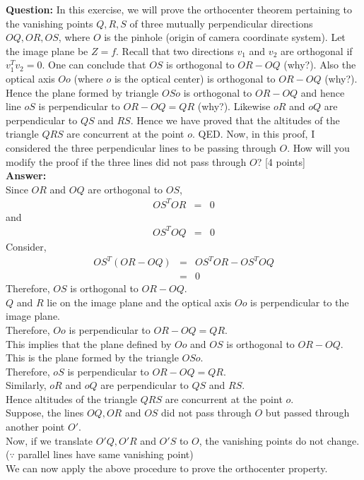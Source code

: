\documentclass[11pt]{article}
\begin{document}
\maketitle

\textbf{Question:} In this exercise, we will prove the orthocenter theorem pertaining to the vanishing points $Q,R,S$ of three mutually perpendicular directions $OQ, OR, OS$, where $O$ is the pinhole (origin of camera coordinate system). Let the image plane be $Z = f$. Recall that two directions $v_1$ and $v_2$ are orthogonal if $v^T_1 v_2 = 0$. One can conclude that $OS$ is orthogonal to $OR-OQ$ (why?). Also the optical axis $Oo$ (where $o$ is the optical center) is orthogonal to $OR-OQ$ (why?). Hence the plane formed by triangle $OSo$ is orthogonal to $OR-OQ$ and hence line $oS$ is perpendicular to $OR-OQ = QR$ (why?). Likewise $oR$ and $oQ$ are perpendicular to $QS$ and $RS$. Hence we have proved that the altitudes of the triangle $QRS$ are concurrent at the point $o$. QED. Now, in this proof, I considered the three perpendicular lines to be passing through $O$. How will you modify the proof if the three lines did not pass through $O$? \textsf{[4 points]} \\

\textbf{Answer:} \\
Since $OR$ and $OQ$ are orthogonal to $OS$,
\begin{eqnarray*}
OS^TOR &=& 0
\end{eqnarray*}
and
\begin{eqnarray*}
OS^TOQ &=& 0
\end{eqnarray*}
Consider,
\begin{eqnarray*}
OS^T(OR - OQ) &=& OS^TOR - OS^TOQ\\
&=& 0
\end{eqnarray*}
Therefore, $OS$ is orthogonal to $OR-OQ$.\\

$Q$ and $R$ lie on the image plane and the optical axis $Oo$ is perpendicular to the image plane.\\
Therefore, $Oo$ is perpendicular to $OR-OQ = QR$.\\

This implies that the plane defined by $Oo$ and $OS$ is orthogonal to $OR - OQ$. This is the plane formed by the triangle $OSo$.\\
Therefore, $oS$ is perpendicular to $OR - OQ = QR$.\\

Similarly, $oR$ and $oQ$ are perpendicular to $QS$ and $RS$. \\
Hence altitudes of the triangle $QRS$ are concurrent at the point $o$.\\

Suppose, the lines $OQ, OR$ and $OS$ did not pass through $O$ but passed through another point $O'$.\\
Now, if we translate $O'Q, O'R$ and $O'S$ to $O$, the vanishing points do not change. ($\because$ parallel lines have same vanishing point) \\
We can now apply the above procedure to prove the orthocenter property. \\
\end{document}
